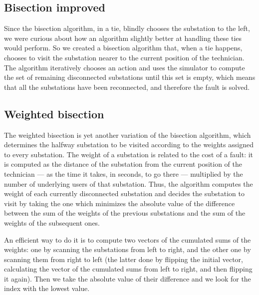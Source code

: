 \subsection{Bisection improved}

Since the bisection algorithm, in a tie, blindly chooses the substation to the left, we were curious about how an algorithm slightly better at handling these ties would perform. So we created a bisection algorithm that, when a tie happens, chooses to visit the substation nearer to the current position of the technician. The algorithm iteratively chooses an action and uses the simulator to compute the set of remaining disconnected substations until this set is empty, which means that all the substations have been reconnected, and therefore the fault is solved.


\subsection{Weighted bisection}

The weighted bisection is yet another variation of the bisection algorithm, which determines the halfway substation to be visited according to the weights assigned to every substation. The weight of a substation is related to the cost of a fault: it is computed as the distance of the substation from the current position of the technician --- as the time it takes, in seconds, to go there --- multiplied by the number of underlying users of that substation. Thus, the algorithm computes the weight of each currently disconnected substation and decides the substation to visit by taking the one which minimizes the absolute value of the difference between the sum of the weights of the previous substations and the sum of the weights of the subsequent ones.

An efficient way to do it is to compute two vectors of the cumulated sums of the weights: one by scanning the substations from left to right, and the other one by scanning them from right to left (the latter done by flipping the initial vector, calculating the vector of the cumulated sums from left to right, and then flipping it again). Then we take the absolute value of their difference and we look for the index with the lowest value.